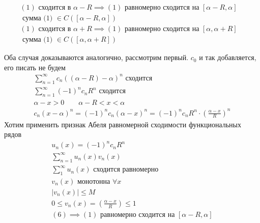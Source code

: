 \documentclass[main]{subfiles}
\begin{document}
\begin{theorem}[Абеля]
    \begin{gather*}
        (1) \text{ сходится в } \alpha - R \implies (1) \text{ равномерно сходится на } [\alpha - R,\alpha]  \quad \\
        \text{ сумма (1) } \in C([\alpha - R,\alpha]) \\
        (1) \text{ сходится в } \alpha + R \implies (1) \text{ равномерно сходится на } [\alpha,\alpha+R]  \quad \\
        \text{ сумма (1) } \in C([\alpha , \alpha +R])
    \end{gather*}
\end{theorem}

\begin{longProof}
    Оба случая доказываются аналогично, рассмотрим первый. $c_0$ и так добавляется, его писать не будем
    \begin{gather*}
        \sum^\infty_{n=1} c_n((\alpha-R)-\alpha)^n \text{ сходится } \\
        \sum^\infty_{n=1} (-1)^n c_n R^n \text{ сходится } \tag{5} \\
        \alpha - x > 0 \quad \quad \alpha - R < x < \alpha \\
        c_n(x-\alpha)^n = (-1)^n c_n (\alpha - x)^n = (-1)^n c_n R^n \cdot \left ( \frac{\alpha-x}{R} \right )^n \tag{6}
    \end{gather*}
    Хотим применить признак Абеля равномерной сходимости функциональных рядов \\
    \begin{gather*}
        u_n(x) = (-1)^n c_n R^n \\
        \sum^\infty_{n=1} u_n(x) v_n(x) \\
        \sum^\infty_1 u_n(x) \text{ сходится равномерно } \\
         v_n(x) \text{ монотонна } \forall x \\
         |v_n(x)| \leq M \\
         0 \leq v_n(x) = \left ( \frac{\alpha-x}{R} \right ) \leq 1 \\
         (6) \implies (1) \text{ равномерно сходится на } [\alpha - R, \alpha] 
    \end{gather*}
\end{longProof}
\end{document}
